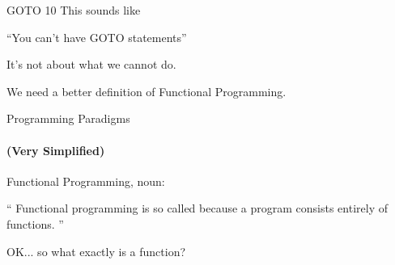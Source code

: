 \documentclass[mathserif]{beamer}
\begin{document}
\begin{frame}{GOTO 10}
    This sounds like
  \begin{exampleblock}{}
    {\Large ``You can't have GOTO statements''}
  \end{exampleblock}
  \vskip5mm
  \hspace*{}
\end{frame}

\begin{frame}{}

  \begin{center}
    {\Huge It's not about what we cannot do.}
  \end{center}

\end{frame}

\begin{frame}{}

  \begin{center}
    {\Huge We need a better definition of Functional Programming.}
  \end{center}

\end{frame}

\begin{frame}{Programming Paradigms}
  \framesubtitle{(Very Simplified)}
\end{frame}

\begin{frame}{Functional Programming, noun:}

\begin{exampleblock}{}
  {\Large ``
  Functional programming is so called because a program consists entirely of \alert{functions}.
  ''}
  \vskip5mm
  \hspace*{}
\end{exampleblock}
\end{frame}

\begin{frame}{}

  {\Large OK... so what exactly is a \alert{function}?}

\end{frame}
\end{document}
